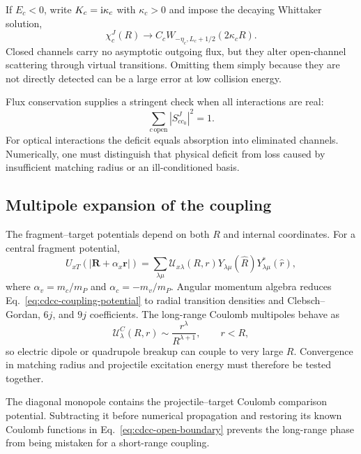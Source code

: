 If $E_c<0$, write $K_c=\mathrm{i}\kappa_c$ with $\kappa_c>0$ and impose the decaying
Whittaker solution,
\begin{equation}
  \chi_c^J(R)\longrightarrow
  C_cW_{-\eta_c,L_c+1/2}(2\kappa_cR).
  \label{eq:cdcc-closed-boundary}
\end{equation}
Closed channels carry no asymptotic outgoing flux, but they alter open-channel
scattering through virtual transitions.  Omitting them simply because they
are not directly detected can be a large error at low collision energy.

Flux conservation supplies a stringent check when all interactions are real:
\begin{equation}
  \sum_{c\,\mathrm{open}}|S^J_{cc_0}|^2=1.
  \label{eq:cdcc-unitarity}
\end{equation}
For optical interactions the deficit equals absorption into eliminated
channels.  Numerically, one must distinguish that physical deficit from loss
caused by insufficient matching radius or an ill-conditioned basis.

\subsection{Multipole expansion of the coupling}
\label{subsec:cdcc-multipoles}

The fragment--target potentials depend on both $R$ and internal coordinates.
For a central fragment potential,
\begin{equation}
  U_{xT}(|\bm R+\alpha_x\bm r|)
  =\sum_{\lambda\mu}
  \mathcal U_{x\lambda}(R,r)
  Y_{\lambda\mu}(\hat R)
  Y_{\lambda\mu}^*(\hat r),
  \label{eq:cdcc-multipole-expansion}
\end{equation}
where $\alpha_v=m_c/m_P$ and $\alpha_c=-m_v/m_P$.  Angular momentum algebra
reduces Eq.~\eqref{eq:cdcc-coupling-potential} to radial transition densities
and Clebsch--Gordan, $6j$, and $9j$ coefficients.  The long-range Coulomb
multipoles behave as
\begin{equation}
  \mathcal U^{C}_{\lambda}(R,r)
  \sim \frac{r^\lambda}{R^{\lambda+1}},
  \qquad r<R,
  \label{eq:coulomb-multipole-tail}
\end{equation}
so electric dipole or quadrupole breakup can couple to very large $R$.
Convergence in matching radius and projectile excitation energy must therefore
be tested together.

The diagonal monopole contains the projectile--target Coulomb comparison
potential.  Subtracting it before numerical propagation and restoring its
known Coulomb functions in Eq.~\eqref{eq:cdcc-open-boundary} prevents the
long-range phase from being mistaken for a short-range coupling.

